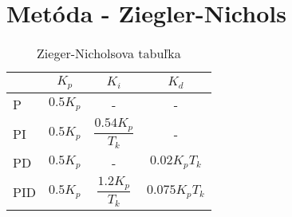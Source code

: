 \chapter{Metóda - Ziegler-Nichols}

\bgroup
\def\arraystretch{1.8}
\begin{table}[h]
\centering
\begin{tabular}{|m{1.7cm}|c|c|c|}
\hline
 & \textbf{$K_p$} & \textbf{$K_i$} & \textbf{$K_d$}\\
\hline
P & $0.5K_p$ & - & - \\
PI & $0.5K_p$ & $\dfrac{0.54K_p}{T_k}$ & - \\
PD & $0.5K_p$ & - & $0.02K_pT_k$ \\
PID & $0.5K_p$ & $\dfrac{1.2K_p}{T_k}$ & $0.075K_pT_k$ \\
\hline
\end{tabular}
\caption{Zieger-Nicholsova tabuľka}
\label{tab:Ziegler-Nichols}
\end{table}
\egroup
